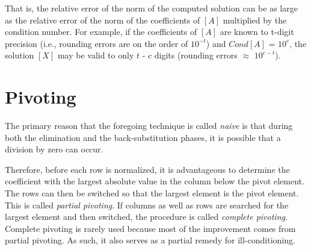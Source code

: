 \documentclass[book.tex]{subfiles}
\begin{document}
That is, the relative error of the norm of the computed solution can be as large as the relative error of the norm of the coefficients of $[A]$ multiplied by the condition number. For example, if the coefficients of $[A]$ are known to t-digit precision (i.e., rounding errors are on the order of $10^{-t}$) and $Cond[A]$ = $10^c$, the solution $[X]$ may be valid to only $t$ - $c$ digits (rounding errors $\approx$ $10^{c-t}$).






\section{Pivoting}

The primary reason that the foregoing technique is called \textit{naive} is that during both the elimination and the back-substitution phases, it is possible that a division by zero can occur.

Therefore, before each row is normalized, it is advantageous to determine the coefficient with the largest absolute value in the column below the pivot element. The rows can then be switched so that the largest element is the pivot element. This is called \textit{partial pivoting}. If columns as well as rows are searched for the largest element and then switched, the procedure is called \textit{complete pivoting}. Complete pivoting is rarely used because most of the improvement comes from partial pivoting. As such, it also serves as a partial remedy for ill-conditioning.
%	
%	
%	
%	
%	
%	
%	
\end{document}
